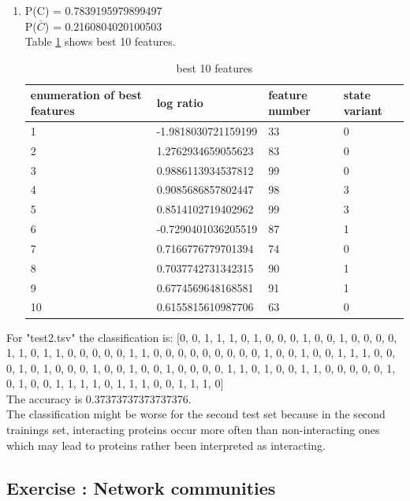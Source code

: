 \documentclass[10pt,a4paper]{article}
\newcommand{\exercise}[1]
{
  \stepcounter{subsection}
  \subsection*{Exercise \thesubsection: #1}

}
\begin{document}
\begin{enumerate}
\item P(C) = 0.7839195979899497\\
P($\bar{C}$) = 0.2160804020100503\\
Table \ref{tab2} shows best 10 features.\\
\begin{table}[!h]
\label{tab2}
\begin{tabular}{llll}
enumeration of best features & log ratio & feature number & state variant\\
\hline
1 & -1.9818030721159199 & 33 & 0\\
2 & 1.2762934659055623 & 83 & 0\\
3 & 0.9886113934537812 & 99 & 0\\
4 & 0.9085686857802447 & 98 & 3\\
5 & 0.8514102719402962 & 99 & 3\\
6 & -0.7290401036205519 & 87 & 1\\
7 & 0.7166776779701394 & 74 & 0\\
8 & 0.7037742731342315 & 90 & 1\\
9 & 0.6774569648168581 & 91 & 1\\
10 & 0.6155815610987706 & 63 & 0\\
\end{tabular}
\caption{best 10 features}
\end{table}
\end{enumerate}
For "test2.tsv" the classification is: [0, 0, 1, 1, 1, 0, 1, 0, 0, 0, 1, 0, 0, 1, 0, 0, 0, 0, 1, 1, 0, 1, 1, 0, 0, 0, 0, 0, 1, 1, 0, 0, 0, 0, 0, 0, 0, 0, 0, 1, 0, 0, 1, 0, 0, 1, 1, 1, 0, 0, 0, 1, 0, 1, 0, 0, 0, 1, 0, 0, 1, 0, 0, 1, 0, 0, 0, 0, 1, 1, 0, 1, 0, 0, 1, 1, 0, 0, 0, 0, 0, 1, 0, 1, 0, 0, 1, 1, 1, 1, 0, 1, 1, 1, 0, 0, 1, 1, 1, 0]\\
The accuracy is 0.37373737373737376.\\
The classification might be worse for the second test set because in the second trainings set, interacting proteins occur more often than non-interacting ones which may lead to proteins rather been interpreted as interacting.
\newpage
\exercise{Network communities}
\end{document}
